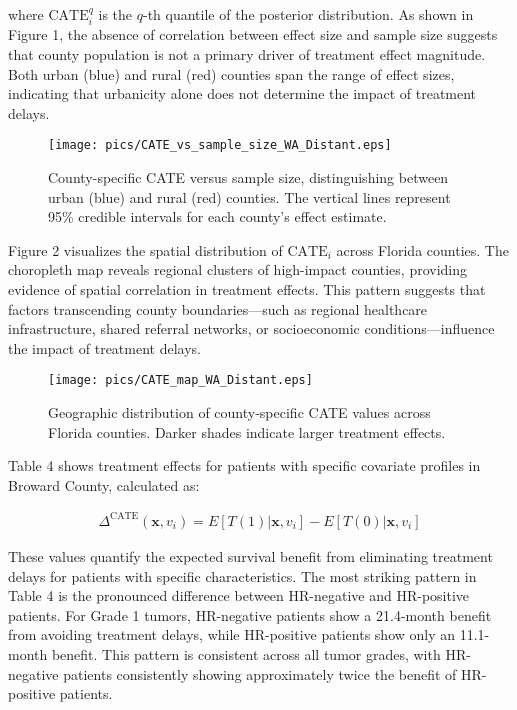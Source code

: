 \documentclass[useAMS,referee]{biom}
\begin{document}
where $\text{CATE}_i^{q}$ is the $q$-th quantile of the posterior distribution. As shown in Figure 1, the absence of correlation between effect size and sample size suggests that county population is not a primary driver of treatment effect magnitude. Both urban (blue) and rural (red) counties span the range of effect sizes, indicating that urbanicity alone does not determine the impact of treatment delays.

\begin{figure}[ht]
\centering
\texttt{[image: pics/CATE\_vs\_sample\_size\_WA\_Distant.eps]}
\caption{County-specific CATE versus sample size, distinguishing between urban (blue) and rural (red) counties. The vertical lines represent 95\% credible intervals for each county's effect estimate.}
\end{figure}

Figure 2 visualizes the spatial distribution of $\text{CATE}_i$ across Florida counties. The choropleth map reveals regional clusters of high-impact counties, providing evidence of spatial correlation in treatment effects. This pattern suggests that factors transcending county boundaries—such as regional healthcare infrastructure, shared referral networks, or socioeconomic conditions—influence the impact of treatment delays.

\begin{figure}[ht]
\centering
\texttt{[image: pics/CATE\_map\_WA\_Distant.eps]}
\caption{Geographic distribution of county-specific CATE values across Florida counties. Darker shades indicate larger treatment effects.}
\end{figure}

Table 4 shows treatment effects for patients with specific covariate profiles in Broward County, calculated as:

\begin{align}
\Delta^{\text{CATE}}(\mathbf{x}, v_i) = E[T(1) | \mathbf{x}, v_i] - E[T(0) | \mathbf{x}, v_i]
\end{align}

These values quantify the expected survival benefit from eliminating treatment delays for patients with specific characteristics. The most striking pattern in Table 4 is the pronounced difference between HR-negative and HR-positive patients. For Grade 1 tumors, HR-negative patients show a 21.4-month benefit from avoiding treatment delays, while HR-positive patients show only an 11.1-month benefit. This pattern is consistent across all tumor grades, with HR-negative patients consistently showing approximately twice the benefit of HR-positive patients.
\end{document}
